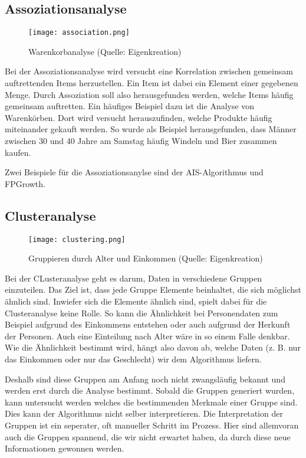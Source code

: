 \subsection{Assoziationsanalyse}
\begin{figure}[h!]
	\centering
	\texttt{[image: association.png]}
	\caption{Warenkorbanalyse (Quelle: Eigenkreation)}
\end{figure}
Bei der Assoziationsanalyse wird versucht eine Korrelation zwischen gemeinsam auftrettenden Items herzustellen.
Ein Item ist dabei ein Element einer gegebenen Menge. Durch Assoziation soll also herausgefunden werden, welche Items häufig gemeinsam auftretten. Ein häufiges Beispiel dazu ist die Analyse von Warenkörben. Dort wird versucht herauszufinden, welche Produkte häufig miteinander gekauft werden. So wurde als Beispiel herausgefunden, dass Männer zwischen 30 und 40 Jahre am Samstag häufig Windeln und Bier zusammen kaufen.

Zwei Beispiele für die Assoziationsanylse sind der AIS-Algorithmus und FPGrowth.

\subsection{Clusteranalyse}
\label{sec:clustering}
\begin{figure}[h!]
	\centering
	\texttt{[image: clustering.png]}
	\caption{Gruppieren durch Alter und Einkommen (Quelle: Eigenkreation)}
\end{figure}
Bei der CLusteranalyse geht es darum, Daten in verschiedene Gruppen einzuteilen. Das Ziel ist, dass jede Gruppe Elemente beinhaltet, die sich möglichst ähnlich sind. Inwiefer sich die Elemente ähnlich sind, spielt dabei für die Clusteranalyse keine Rolle. So kann die Ähnlichkeit bei Personendaten zum Beispiel aufgrund des Einkommens entstehen oder auch aufgrund der Herkunft der Personen. Auch eine Einteilung nach Alter wäre in so einem Falle denkbar. Wie die Ähnlichkeit bestimmt wird, hängt also davon ab, welche Daten (z. B. nur das Einkommen oder nur das Geschlecht) wir dem Algorithmus liefern.

Deshalb sind diese Gruppen am Anfang noch nicht zwangsläufig bekannt und werden erst durch die Analyse bestimmt. Sobald die Gruppen generiert wurden, kann untersucht werden welches die bestimmenden Merkmale einer Gruppe sind. Dies kann der Algorithmus nicht selber interpretieren. Die Interpretation der Gruppen ist ein seperater, oft manueller Schritt im Prozess. Hier sind allemvoran auch die Gruppen spannend, die wir nicht erwartet haben, da durch diese neue Informationen gewonnen werden. 

